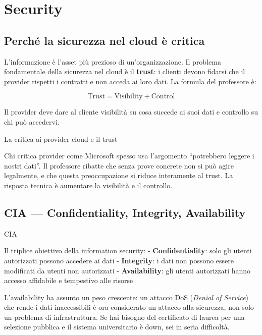 \documentclass[
  italian,
  openany]{book}
\begin{document}
\section{Security}\label{security}

\subsection{Perché la sicurezza nel cloud è
critica}\label{perchuxe9-la-sicurezza-nel-cloud-uxe8-critica}

L'informazione è l'asset più prezioso di un'organizzazione. Il problema
fondamentale della sicurezza nel cloud è il \textbf{trust}: i clienti
devono fidarsi che il provider rispetti i contratti e non acceda ai loro
dati. La formula del professore è:

\[\text{Trust} = \text{Visibility} + \text{Control}\]

Il provider deve dare al cliente visibilità su cosa succede ai suoi dati
e controllo su chi può accedervi.

\begin{calloutnote}{La critica ai provider cloud e il trust}

Chi critica provider come Microsoft spesso usa l'argomento ``potrebbero
leggere i nostri dati''. Il professore ribatte che senza prove concrete
non si può agire legalmente, e che questa preoccupazione si riduce
interamente al trust. La risposta tecnica è aumentare la visibilità e il
controllo.

\end{calloutnote}

\subsection{CIA --- Confidentiality, Integrity,
Availability}\label{cia-confidentiality-integrity-availability}

\begin{calloutdefinition}{CIA}

Il triplice obiettivo della information security: -
\textbf{Confidentiality}: solo gli utenti autorizzati possono accedere
ai dati - \textbf{Integrity}: i dati non possono essere modificati da
utenti non autorizzati - \textbf{Availability}: gli utenti autorizzati
hanno accesso affidabile e tempestivo alle risorse

\end{calloutdefinition}

L'availability ha assunto un peso crescente: un attacco DoS
(\emph{Denial of Service}) che rende i dati inaccessibili è ora
considerato un attacco alla sicurezza, non solo un problema di
infrastruttura. Se hai bisogno del certificato di laurea per una
selezione pubblica e il sistema universitario è down, sei in seria
difficoltà.
\end{document}
